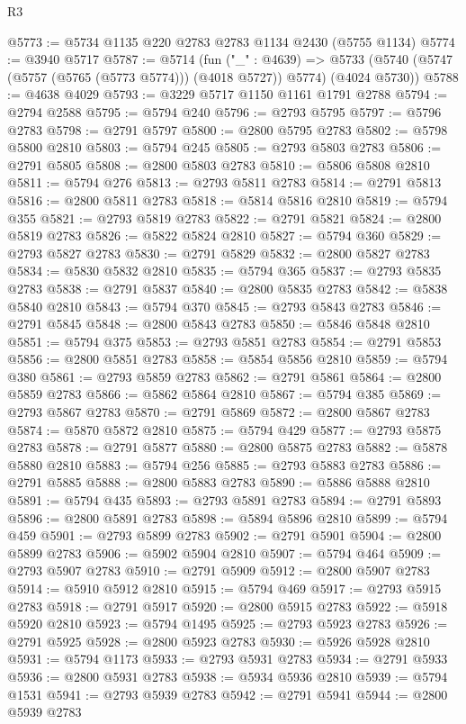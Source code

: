 \begin{lexlean}{R3}
\begin{coremodule}
@5773 := @5734 @1135 @220 @2783 @2783 @1134 @2430 (@5755 @1134)
@5774 := @3940 @5717
@5787 := @5714
    (fun ("_" : @4639) =>
    @5733 (@5740 (@5747 (@5757 (@5765 (@5773 @5774))) (@4018 @5727)) @5774) (@4024 @5730))
@5788 := @4638 @4029
@5793 := @3229 @5717 @1150 @1161 @1791 @2788
@5794 := @2794 @2588
@5795 := @5794 @240
@5796 := @2793 @5795
@5797 := @5796 @2783
@5798 := @2791 @5797
@5800 := @2800 @5795 @2783
@5802 := @5798 @5800 @2810
@5803 := @5794 @245
@5805 := @2793 @5803 @2783
@5806 := @2791 @5805
@5808 := @2800 @5803 @2783
@5810 := @5806 @5808 @2810
@5811 := @5794 @276
@5813 := @2793 @5811 @2783
@5814 := @2791 @5813
@5816 := @2800 @5811 @2783
@5818 := @5814 @5816 @2810
@5819 := @5794 @355
@5821 := @2793 @5819 @2783
@5822 := @2791 @5821
@5824 := @2800 @5819 @2783
@5826 := @5822 @5824 @2810
@5827 := @5794 @360
@5829 := @2793 @5827 @2783
@5830 := @2791 @5829
@5832 := @2800 @5827 @2783
@5834 := @5830 @5832 @2810
@5835 := @5794 @365
@5837 := @2793 @5835 @2783
@5838 := @2791 @5837
@5840 := @2800 @5835 @2783
@5842 := @5838 @5840 @2810
@5843 := @5794 @370
@5845 := @2793 @5843 @2783
@5846 := @2791 @5845
@5848 := @2800 @5843 @2783
@5850 := @5846 @5848 @2810
@5851 := @5794 @375
@5853 := @2793 @5851 @2783
@5854 := @2791 @5853
@5856 := @2800 @5851 @2783
@5858 := @5854 @5856 @2810
@5859 := @5794 @380
@5861 := @2793 @5859 @2783
@5862 := @2791 @5861
@5864 := @2800 @5859 @2783
@5866 := @5862 @5864 @2810
@5867 := @5794 @385
@5869 := @2793 @5867 @2783
@5870 := @2791 @5869
@5872 := @2800 @5867 @2783
@5874 := @5870 @5872 @2810
@5875 := @5794 @429
@5877 := @2793 @5875 @2783
@5878 := @2791 @5877
@5880 := @2800 @5875 @2783
@5882 := @5878 @5880 @2810
@5883 := @5794 @256
@5885 := @2793 @5883 @2783
@5886 := @2791 @5885
@5888 := @2800 @5883 @2783
@5890 := @5886 @5888 @2810
@5891 := @5794 @435
@5893 := @2793 @5891 @2783
@5894 := @2791 @5893
@5896 := @2800 @5891 @2783
@5898 := @5894 @5896 @2810
@5899 := @5794 @459
@5901 := @2793 @5899 @2783
@5902 := @2791 @5901
@5904 := @2800 @5899 @2783
@5906 := @5902 @5904 @2810
@5907 := @5794 @464
@5909 := @2793 @5907 @2783
@5910 := @2791 @5909
@5912 := @2800 @5907 @2783
@5914 := @5910 @5912 @2810
@5915 := @5794 @469
@5917 := @2793 @5915 @2783
@5918 := @2791 @5917
@5920 := @2800 @5915 @2783
@5922 := @5918 @5920 @2810
@5923 := @5794 @1495
@5925 := @2793 @5923 @2783
@5926 := @2791 @5925
@5928 := @2800 @5923 @2783
@5930 := @5926 @5928 @2810
@5931 := @5794 @1173
@5933 := @2793 @5931 @2783
@5934 := @2791 @5933
@5936 := @2800 @5931 @2783
@5938 := @5934 @5936 @2810
@5939 := @5794 @1531
@5941 := @2793 @5939 @2783
@5942 := @2791 @5941
@5944 := @2800 @5939 @2783

\end{coremodule}
\end{lexlean}
